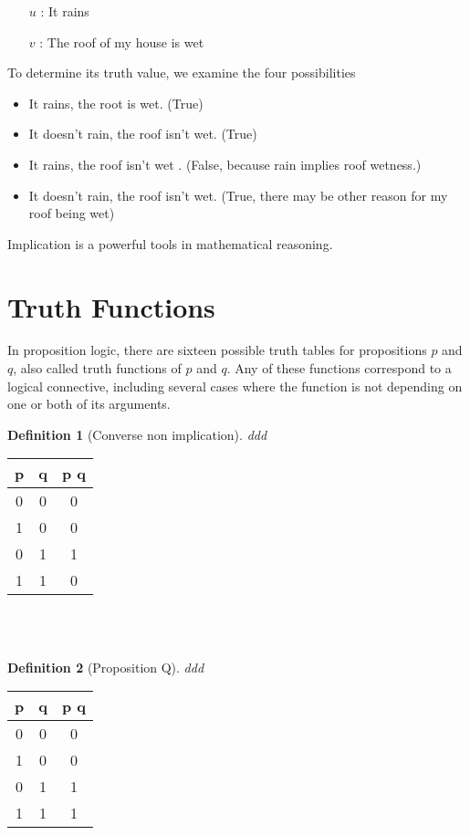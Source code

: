 \documentclass[10pt,a4paper,draft,titlepage,onecolumn]{book}
\newtheorem{definition}{Definition}[section]
\begin{document}
\begin{itemize}
\item[$u$]: It rains
\item[$v$]: The roof of my house is wet
\end{itemize}
To determine its truth value, we examine the four possibilities
\begin{itemize}
\item It rains, the root is wet. (True)
\item It doesn't rain, the roof isn't wet. (True)
\item It rains, the roof isn't wet . (False, because rain implies roof wetness.)
\item It doesn't rain, the roof isn't wet. (True, there may be other reason for my roof being wet)
\end{itemize}
Implication is a powerful tools in mathematical reasoning. 




\section{Truth Functions}
In proposition logic, there are sixteen possible truth tables for propositions $p$ and $q$, also called truth functions of $p$ and $q$. Any of these functions correspond to a logical connective, including several cases where the function is  not depending on one or both of its arguments.




\begin{definition}[Converse non implication]ddd
\end{definition}  
\begin{tabular}{ |c|c|c| }
 \hline
 p & q &  p  q  \\
 \hline
 0 & 0 & 0 \\
 1 & 0 & 0\\
 0 & 1 & 1\\
 1 & 1 & 0\\
 \hline
\end{tabular}\\\\

\begin{definition}[Proposition Q]ddd
\end{definition}
\begin{tabular}{ |c|c|c| }
 \hline
 p & q &  p  q  \\
 \hline
 0 & 0 & 0 \\
 1 & 0 & 0\\
 0 & 1 & 1\\
 1 & 1 & 1\\
 \hline
\end{tabular}\\\\
\end{document}
